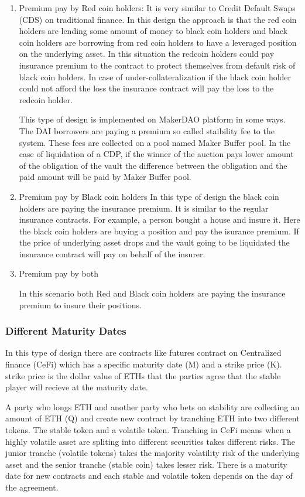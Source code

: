 \begin{enumerate}
	\item Premium pay by Red coin holders:
	It is very similar to Credit Default Swaps (CDS) on traditional finance. In this design the approach is that the red coin holders are lending some amount of money to black coin holders and black coin holders are borrowing from red coin holders to have a leveraged position on the underlying asset. In this situation the redcoin holders could pay insurance premium to the contract to protect themselves from default risk of black coin holders. In case of under-collateralization if the black coin holder could not afford the loss the insurance contract will pay the loss to the redcoin holder.

This type of design is implemented on MakerDAO platform in some ways. The DAI borrowers are paying a premium so called staibility fee to the system. These fees are collected on a pool named Maker Buffer pool. In the case of liquidation of a CDP, if the winner of the auction pays lower amount of the obligation of the vault the difference between the obligation and the paid amount will be paid by Maker Buffer pool.

	\item Premium pay by Black coin holders
In this type of design the black coin holders are paying the insurance premium. It is similar to the regular insurance contracts. For example, a person bought a house and insure it. Here the black coin holders are buying a position and pay the isurance premium. If the price of underlying asset drops and the vault going to be liquidated the insurance contract will pay on behalf of the insurer.
	\item Premium pay by both
	
In this scenario both Red and Black coin holders are paying the insurance premium to insure their positions. 
\end{enumerate}

\subsubsection{Different Maturity Dates}
In this type of design there are contracts like futures contract on Centralized finance (CeFi) which has a specific maturity date (M) and a strike price (K). strike price is the dollar value of ETHs that the parties agree that the stable player will recieve at the maturity date. 


A party who longs ETH and another party who bets on stability are collecting an amount of ETH (Q) and create new contract by tranching ETH into two different tokens. The stable token and a volatile token. Tranching in CeFi means when a highly volatile asset are spliting into different securities takes different risks. The junior tranche (volatile tokens) takes the majority volatility risk of the underlying asset and the senior tranche (stable coin) takes lesser risk. There is a maturity date for new contracts and each stable and volatile token depends on the day of the agreement. 


